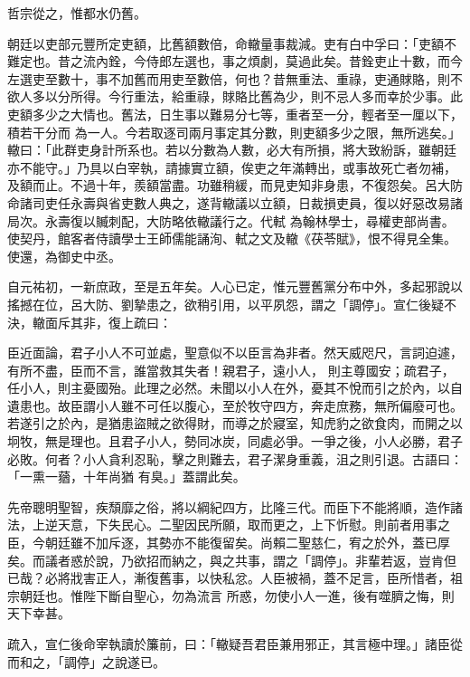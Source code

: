\begin{pinyinscope}
 哲宗從之，惟都水仍舊。



 朝廷以吏部元豐所定吏額，比舊額數倍，命轍量事裁減。吏有白中孚曰：「吏額不難定也。昔之流內銓，今侍郎左選也，事之煩劇，莫過此矣。昔銓吏止十數，而今左選吏至數十，事不加舊而用吏至數倍，何也？昔無重法、重祿，吏通賕賂，則不欲人多以分所得。今行重法，給重祿，賕賂比舊為少，則不忌人多而幸於少事。此吏額多少之大情也。舊法，日生事以難易分七等，重者至一分，輕者至一厘以下，積若干分而
 為一人。今若取逐司兩月事定其分數，則吏額多少之限，無所逃矣。」轍曰：「此群吏身計所系也。若以分數為人數，必大有所損，將大致紛訴，雖朝廷亦不能守。」乃具以白宰執，請據實立額，俟吏之年滿轉出，或事故死亡者勿補，及額而止。不過十年，羨額當盡。功雖稍緩，而見吏知非身患，不復怨矣。呂大防命諸司吏任永壽與省吏數人典之，遂背轍議以立額，日裁損吏員，復以好惡改易諸局次。永壽復以贓刺配，大防略依轍議行之。代軾
 為翰林學士，尋權吏部尚書。使契丹，館客者侍讀學士王師儒能誦洵、軾之文及轍《茯苓賦》，恨不得見全集。使還，為御史中丞。



 自元祐初，一新庶政，至是五年矣。人心已定，惟元豐舊黨分布中外，多起邪說以搖撼在位，呂大防、劉摯患之，欲稍引用，以平夙怨，謂之「調停」。宣仁後疑不決，轍面斥其非，復上疏曰：



 臣近面論，君子小人不可並處，聖意似不以臣言為非者。然天威咫尺，言詞迫遽，有所不盡，臣而不言，誰當救其失者！親君子，遠小人，
 則主尊國安；疏君子，任小人，則主憂國殆。此理之必然。未聞以小人在外，憂其不悅而引之於內，以自遺患也。故臣謂小人雖不可任以腹心，至於牧守四方，奔走庶務，無所偏廢可也。若遂引之於內，是猶患盜賊之欲得財，而導之於寢室，知虎豹之欲食肉，而開之以坰牧，無是理也。且君子小人，勢同冰炭，同處必爭。一爭之後，小人必勝，君子必敗。何者？小人貪利忍恥，擊之則難去，君子潔身重義，沮之則引退。古語曰：「一熏一蕕，十年尚猶
 有臭。」蓋謂此矣。



 先帝聰明聖智，疾頹靡之俗，將以綱紀四方，比隆三代。而臣下不能將順，造作諸法，上逆天意，下失民心。二聖因民所願，取而更之，上下忻慰。則前者用事之臣，今朝廷雖不加斥逐，其勢亦不能復留矣。尚賴二聖慈仁，宥之於外，蓋已厚矣。而議者惑於說，乃欲招而納之，與之共事，謂之「調停」。非輩若返，豈肯但已哉？必將戕害正人，漸復舊事，以快私忿。人臣被禍，蓋不足言，臣所惜者，祖宗朝廷也。惟陛下斷自聖心，勿為流言
 所惑，勿使小人一進，後有噬臍之悔，則天下幸甚。



 疏入，宣仁後命宰執讀於簾前，曰：「轍疑吾君臣兼用邪正，其言極中理。」諸臣從而和之，「調停」之說遂已。




\end{pinyinscope}
